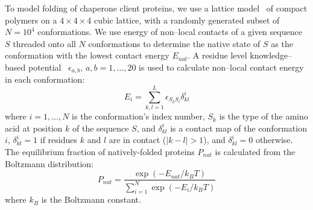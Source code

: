 \documentclass[10pt,letterpaper]{article}
\begin{document}
To model folding of chaperone client proteins, we use a lattice model~\cite{Shakhnovich1990Enumeration,Sikosek2014Biophysics} of compact polymers on a $4\times4\times4$ cubic lattice, with a randomly generated subset of $N=10^{4}$ conformations. We use energy of non--local contacts of a given sequence $S$ threaded onto all $N$ conformations to determine the native state of $S$ as the conformation with the lowest contact energy $E_{nat}$. A residue level knowledge--based potential~\cite{Miyazawa1999SelfConsistent} $\epsilon_{a,b},\, a,b=1,\dots,20$ is used to calculate non--local contact energy in each conformation:
\begin{equation}
	\label{protein_globule_energy}
	E_{i} = \sum\limits_{k,l=1}^{L}\epsilon_{S_{k}S_{l}}\delta^{i}_{kl}
\end{equation}
where $i=1,\dots,N$ is the conformation's index number, $S_{k}$ is the type of the amino acid at position $k$ of the sequence $S$, and $\delta^{i}_{kl}$ is a contact map of the conformation $i$,  $\delta^{i}_{kl}=1$ if residues $k$ and $l$ are in contact ($|k-l|>1$), and $\delta^{i}_{kl}=0$ otherwise. The equilibrium fraction of natively-folded proteins $P_{nat}$ is calculated from the Boltzmann distribution:
\begin{equation}
	\label{pnat_boltzmann}
	P_{nat} = \frac{\exp\left(-E_{nat}/k_{B}T\right)}{\sum\limits_{i=1}^{N}\exp\left(-E_{i}/k_{B}T\right)}
\end{equation}
where $k_{B}$ is the Boltzmann constant. 

\end{document}
